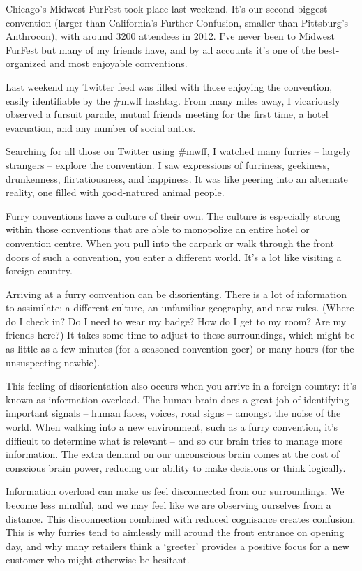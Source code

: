 
Chicago's Midwest FurFest took place last weekend. It's our second-biggest convention (larger than California's Further Confusion, smaller than Pittsburg's Anthrocon), with around 3200 attendees in 2012. I've never been to Midwest FurFest but many of my friends have, and by all accounts it's one of the best-organized and most enjoyable conventions.

Last weekend my Twitter feed was filled with those enjoying the convention, easily identifiable by the \#mwff hashtag. From many miles away, I vicariously observed a fursuit parade, mutual friends meeting for the first time, a hotel evacuation, and any number of social antics.

Searching for all those on Twitter using \#mwff, I watched many furries -- largely strangers -- explore the convention. I saw expressions of furriness, geekiness, drunkenness, flirtatiousness, and happiness. It was like peering into an alternate reality, one filled with good-natured animal people.

Furry conventions have a culture of their own. The culture is especially strong within those conventions that are able to monopolize an entire hotel or convention centre. When you pull into the carpark or walk through the front doors of such a convention, you enter a different world. It's a lot like visiting a foreign country.

Arriving at a furry convention can be disorienting. There is a lot of information to assimilate: a different culture, an unfamiliar geography, and new rules. (Where do I check in? Do I need to wear my badge? How do I get to my room? Are my friends here?) It takes some time to adjust to these surroundings, which might be as little as a few minutes (for a seasoned convention-goer) or many hours (for the unsuspecting newbie).

This feeling of disorientation also occurs when you arrive in a foreign country: it's known as information overload. The human brain does a great job of identifying important signals -- human faces, voices, road signs -- amongst the noise of the world. When walking into a new environment, such as a furry convention, it's difficult to determine what is relevant -- and so our brain tries to manage more information. The extra demand on our unconscious brain comes at the cost of conscious brain power, reducing our ability to make decisions or think logically.

Information overload can make us feel disconnected from our surroundings. We become less mindful, and we may feel like we are observing ourselves from a distance. This disconnection combined with reduced cognisance creates confusion. This is why furries tend to aimlessly mill around the front entrance on opening day, and why many retailers think a `greeter' provides a positive focus for a new customer who might otherwise be hesitant.

